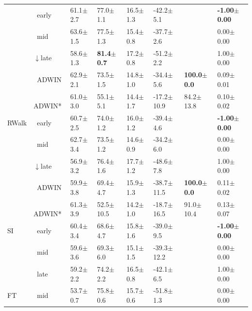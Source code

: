 \begin{tabular}{llllllll}
 & $\ \;$early & 61.1\tiny{$\pm$2.7} & 77.0\tiny{$\pm$1.1} & 16.5\tiny{$\pm$1.3} & -42.2\tiny{$\pm$5.1} &  & \textbf{-1.00\tiny{$\pm$0.00}} \\
 & $\ \;$mid & 63.6\tiny{$\pm$1.5} & 77.5\tiny{$\pm$1.3} & 15.4\tiny{$\pm$0.8} & -37.7\tiny{$\pm$2.6} &  & 0.00\tiny{$\pm$0.00} \\
 & $\downarrow$late & 58.6\tiny{$\pm$1.3} & \textbf{81.4\tiny{$\pm$0.7}} & 17.2\tiny{$\pm$0.8} & -51.2\tiny{$\pm$2.2} &  & 1.00\tiny{$\pm$0.00} \\
\midrule
\multirow[t]{5}{*}{RWalk} & $\ \;$ADWIN & 62.9\tiny{$\pm$2.1} & 73.5\tiny{$\pm$1.5} & 14.8\tiny{$\pm$1.0} & -34.4\tiny{$\pm$5.6} & \textbf{100.0\tiny{$\pm$0.0}} & 0.09\tiny{$\pm$0.01} \\
 & $\ \;$ADWIN* & 61.0\tiny{$\pm$3.0} & 55.1\tiny{$\pm$5.1} & 14.4\tiny{$\pm$1.7} & -17.2\tiny{$\pm$10.9} & 84.2\tiny{$\pm$13.8} & 0.10\tiny{$\pm$0.02} \\
 & $\ \;$early & 60.7\tiny{$\pm$2.5} & 74.0\tiny{$\pm$1.2} & 16.0\tiny{$\pm$1.2} & -39.4\tiny{$\pm$4.6} &  & \textbf{-1.00\tiny{$\pm$0.00}} \\
 & $\ \;$mid & 62.7\tiny{$\pm$3.4} & 73.5\tiny{$\pm$1.2} & 14.6\tiny{$\pm$0.9} & -34.2\tiny{$\pm$6.0} &  & 0.00\tiny{$\pm$0.00} \\
 & $\downarrow$late & 56.9\tiny{$\pm$3.2} & 76.4\tiny{$\pm$1.6} & 17.7\tiny{$\pm$1.2} & -48.6\tiny{$\pm$7.8} &  & 1.00\tiny{$\pm$0.00} \\
\midrule
\multirow[t]{5}{*}{SI} & $\ \;$ADWIN & 59.9\tiny{$\pm$3.8} & 69.4\tiny{$\pm$4.7} & 15.9\tiny{$\pm$1.3} & -38.7\tiny{$\pm$11.5} & \textbf{100.0\tiny{$\pm$0.0}} & 0.11\tiny{$\pm$0.02} \\
 & $\ \;$ADWIN* & 61.3\tiny{$\pm$3.9} & 52.5\tiny{$\pm$10.5} & 14.2\tiny{$\pm$1.0} & -18.7\tiny{$\pm$16.5} & 91.0\tiny{$\pm$10.4} & 0.13\tiny{$\pm$0.07} \\
 & $\ \;$early & 60.4\tiny{$\pm$3.4} & 68.6\tiny{$\pm$4.7} & 15.8\tiny{$\pm$1.6} & -39.0\tiny{$\pm$9.5} &  & \textbf{-1.00\tiny{$\pm$0.00}} \\
 & $\ \;$mid & 59.6\tiny{$\pm$3.6} & 69.3\tiny{$\pm$6.0} & 15.1\tiny{$\pm$1.5} & -39.3\tiny{$\pm$12.2} &  & 0.00\tiny{$\pm$0.00} \\
 & $\ \;$late & 59.2\tiny{$\pm$2.2} & 74.2\tiny{$\pm$2.2} & 16.5\tiny{$\pm$0.8} & -42.1\tiny{$\pm$6.5} &  & 1.00\tiny{$\pm$0.00} \\
\midrule
FT & $\ \;$mid & 53.7\tiny{$\pm$0.7} & 75.8\tiny{$\pm$0.6} & 15.7\tiny{$\pm$0.6} & -51.8\tiny{$\pm$1.3} &  & 0.00\tiny{$\pm$0.00} \\
\bottomrule
\end{tabular}
